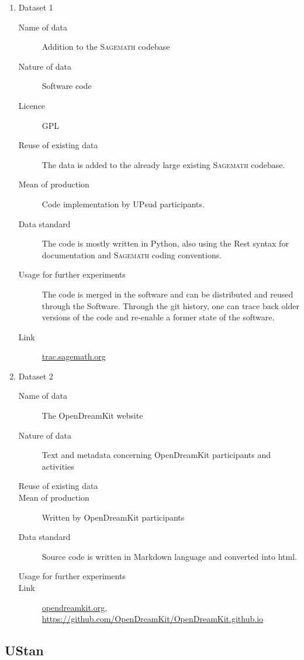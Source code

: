 \documentclass[12pt]{article}
\newcommand{\software}[1]{\textsc{#1}\xspace}
\newcommand{\Sage}{\software{Sagemath}}
\begin{document}
\begin{enumerate}



\item {Dataset 1}


\begin{description}
\item[Name of data] Addition to the \Sage codebase
\item[Nature of data] Software code
\item[Licence] GPL
\item[Reuse of existing data] The data is added to the already large existing \Sage codebase.
\item[Mean of production] Code implementation by UPsud participants.
\item[Data standard] The code is mostly written in Python, also using the Rest syntax for documentation and \Sage coding conventions.
\item [Usage for further experiments] The code is merged in the software and can be distributed and reused through the Software. Through the git history,
one can trace back older versions of the code and re-enable a former state of the software.
\item [Link] \href{http://trac.sagemath.org/}{trac.sagemath.org}
\end{description}


\item{Dataset 2}


\begin{description}
\item[Name of data] The OpenDreamKit website
\item[Nature of data] Text and metadata concerning OpenDreamKit participants and activities
\item[Reuse of existing data]
\item[Mean of production] Written by OpenDreamKit participants
\item[Data standard] Source code is written in Markdown language and converted into html.
\item [Usage for further experiments]
\item [Link] \href{http://opendreamkit.org/}{opendreamkit.org}, \href{https://github.com/OpenDreamKit/OpenDreamKit.github.io}{https://github.com/OpenDreamKit/OpenDreamKit.github.io}
\end{description}

\end{enumerate}
\subsection{UStan}
\end{document}
